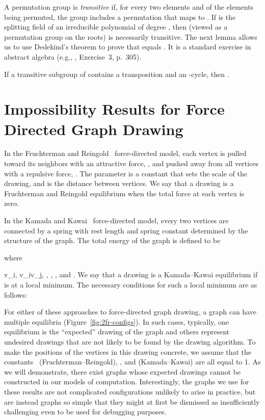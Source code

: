 \documentclass[oribibl,10pt]{llncs}
\begin{document}
A permutation group is \emph{transitive} if, for every two elements  and  of the elements being permuted, the group includes a permutation that maps  to . If  is the splitting field of an irreducible polynomial of degree , then  (viewed as a permutation group on the roots) is necessarily transitive. The next lemma allows us to use Dedekind's theorem to prove that  equals . It is a standard exercise in abstract algebra (e.g., \cite{Jac2012}, Exercise~3, p.~305).

\begin{lemma}
\label{lem:swap+cycle}
If a transitive subgroup   of  contains a transposition and an -cycle, then .
\end{lemma}

\section{Impossibility Results for Force Directed Graph Drawing}
In the Fruchterman and Reingold~\cite{FruRei-SPE-1991} 
force-directed model, each vertex is pulled toward its neighbors with an attractive force, , and pushed away from all vertices with a repulsive force, . The parameter  is a constant that sets the scale of the drawing, and  is the distance between vertices. We say that a drawing is a Fruchterman and Reingold equilibrium when the total force at each vertex is zero.

In the Kamada and Kawai~\cite{KamKaw-IPL-1989} 
force-directed model, every two vertices are connected by a spring with rest length and spring constant determined by the structure of the graph. The total energy of the graph is defined to be

where
\ifFull

\else
v_i,
v_iv_j,
,
,
,
and
.
\fi
We say that a drawing is a Kamada--Kawai equilibrium if  is at a local minimum. The necessary conditions for such a local minimum are as follows:


For either of these approaches to
force-directed graph drawing, a graph can have multiple equilibria (Figure~\ref{fig:2fr-configs}).
In such cases, typically, one equilibrium is the ``expected'' drawing of the graph and others represent undesired drawings that are not likely to be found by the drawing algorithm. To make the positions of the vertices in this drawing concrete, we assume that the constants~ (Fruchterman--Reingold), , and  (Kamada--Kawai) are all equal to 1.
As we will demonstrate, there exist graphs whose expected drawings cannot be constructed in our models of computation.
Interestingly, the graphs we use for these results
are not complicated configurations unlikely to 
arise in practice, but are instead graphs so simple 
that they might at first
be dismissed as insufficiently challenging even 
to be used for debugging purposes.
\end{document}

